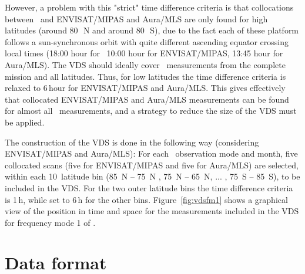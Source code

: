 However, a problem with this "strict" time difference criteria
is that collocations between \smr\ and  ENVISAT/MIPAS and Aura/MLS
are only found for high latitudes (around 80\,\degree\ N and around 80\,\degree\ S),
due to the fact each of these platform follows a sun-synchronous orbit
with quite different ascending equator crossing local times  
(18:00 hour for \smr\, 10:00 hour for ENVISAT/MIPAS,
 13:45 hour for Aura/MLS).
The VDS should ideally cover \smr\ measurements from    
the complete mission and all latitudes. 
Thus, for low latitudes the time difference criteria
is relaxed to 6\,hour for ENVISAT/MIPAS and Aura/MLS.
This gives effectively that collocated ENVISAT/MIPAS and Aura/MLS 
measurements can be found for almost all \smr\ measurements, and a strategy
to reduce the size of the VDS must be applied.

The construction of the VDS is done in the following way (considering ENVISAT/MIPAS and Aura/MLS):
For each \smr\ observation mode and month, five collocated scans
(five for ENVISAT/MIPAS and five for Aura/MLS)  
are selected, within each 10\degree\ latitude bin
(85\degree\ N -- 75\degree\ N , 75\degree\ N -- 65\degree\ N, ... , 75\degree\ S -- 85\degree\ S),
to be included in the VDS. For the two outer latitude bins the
time difference criteria is 1\,h, while set to 6\,h for the other bins.  
Figure~\ref{fig:vdsfm1} shows a graphical view of the position in
time and space for the measurements included in the VDS for
frequency mode 1 of \smr.   




\section{Data format}
